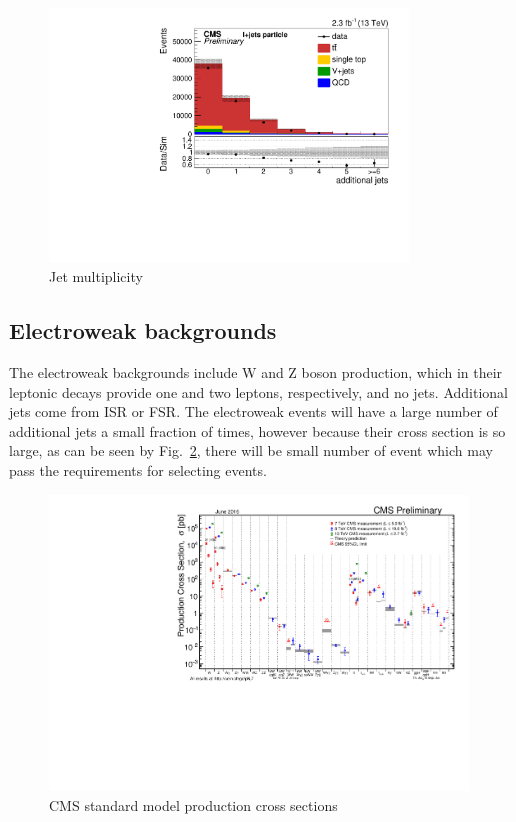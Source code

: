 \begin{figure}[ht!]
\begin{center}
    \includegraphics[width=0.85\textwidth]{images/Theory/ttbarAdd.pdf}
    \caption{Jet multiplicity }
    \label{fig:ttbarAdd}
\end{center}
\end{figure}

\subsection{Electroweak backgrounds}
The electroweak backgrounds include W and Z boson production, which in their leptonic decays provide one and two leptons, respectively, and no jets. Additional jets come from ISR or FSR. The electroweak events will have a large number of additional jets a small fraction of times, however because their cross section is so large, as can be seen by Fig.~\ref{fig:ttbarAdd}, there will be small number of event which may pass the requirements for selecting \tttt events.
\begin{figure}[ht!]
\begin{center}
    \includegraphics[width=0.99\textwidth]{images/Theory/stairway.pdf}
    \caption{CMS standard model production cross sections}
    \label{fig:ttbarAdd}
\end{center}
\end{figure}


